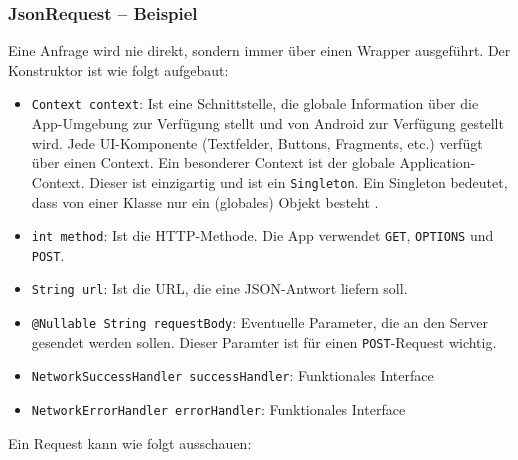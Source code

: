 \hypertarget{jsonrequest-beispiel}{%
\subsubsection{JsonRequest -- Beispiel}\label{jsonrequest-beispiel}}

Eine Anfrage wird nie direkt, sondern immer über einen Wrapper
ausgeführt. Der Konstruktor ist wie folgt aufgebaut:

\begin{itemize}
\tightlist
\item
  \texttt{Context\ context}: Ist eine Schnittstelle, die globale
  Information über die App-Umgebung zur Verfügung stellt \cite{context}
  und von Android zur Verfügung gestellt wird. Jede UI-Komponente
  (\zB Textfelder, Buttons, Fragments, etc.) verfügt über einen Context.
  Ein besonderer Context ist der globale Application-Context. Dieser ist
  einzigartig und ist ein \texttt{Singleton}. Ein Singleton bedeutet,
  dass von einer Klasse nur ein (globales) Objekt besteht
  \cite{singleton}.
\item
  \texttt{int\ method}: Ist die HTTP-Methode. Die App verwendet
  \texttt{GET}, \texttt{OPTIONS} und \texttt{POST}.
\item
  \texttt{String\ url}: Ist die URL, die eine JSON-Antwort liefern soll.
\item
  \texttt{@Nullable\ String\ requestBody}: Eventuelle Parameter, die an
  den Server gesendet werden sollen. Dieser Paramter ist für einen
  \texttt{POST}-Request wichtig.
\item
  \texttt{NetworkSuccessHandler\ successHandler}: Funktionales Interface
\item
  \texttt{NetworkErrorHandler\ errorHandler}: Funktionales Interface
\end{itemize}

Ein Request kann wie folgt ausschauen:

\begin{Shaded}
\begin{Highlighting}[]
  \NormalTok{,}
  \NormalTok{, }\NormalTok{, }
         \CommentTok{// }
\NormalTok{     \},}
         \CommentTok{// }
\NormalTok{     \});}
     
\NormalTok{();}
\end{Highlighting}
\end{Shaded}

